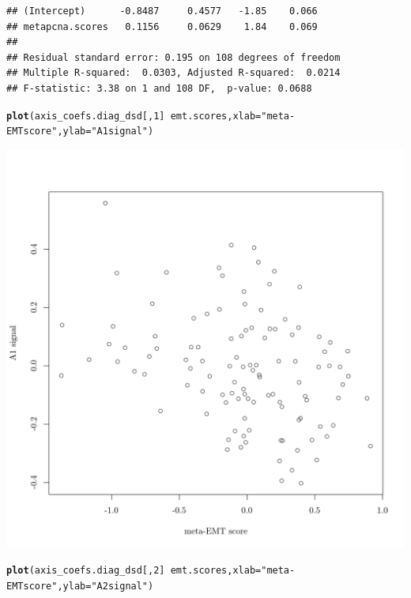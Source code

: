 \documentclass{article}\usepackage[]{graphicx}\usepackage[]{color}
\makeatletter
\def\maxwidth{ %
  \ifdim\Gin@nat@width>\linewidth
    \linewidth
  \else
    \Gin@nat@width
  \fi
}
\newcommand{\hlnum}[1]{\textcolor[rgb]{0.686,0.059,0.569}{#1}}%
\newcommand{\hlstr}[1]{\textcolor[rgb]{0.192,0.494,0.8}{#1}}%
\newcommand{\hlopt}[1]{\textcolor[rgb]{0,0,0}{#1}}%
\newcommand{\hlstd}[1]{\textcolor[rgb]{0.345,0.345,0.345}{#1}}%
\newcommand{\hlkwc}[1]{\textcolor[rgb]{0.333,0.667,0.333}{#1}}%
\newcommand{\hlkwd}[1]{\textcolor[rgb]{0.737,0.353,0.396}{\textbf{#1}}}%
\newenvironment{kframe}{%
 \def\at@end@of@kframe{}%
 \ifinner\ifhmode%
  \def\at@end@of@kframe{\end{minipage}}%
  \begin{minipage}{\columnwidth}%
 \fi\fi%
 \def\FrameCommand##1{\hskip\@totalleftmargin \hskip-\fboxsep
 \colorbox{shadecolor}{##1}\hskip-\fboxsep
     \hskip-\linewidth \hskip-\@totalleftmargin \hskip\columnwidth}%
 \MakeFramed {\advance\hsize-\width
   \@totalleftmargin\z@ \linewidth\hsize
   \@setminipage}}%
 {\par\unskip\endMakeFramed%
 \at@end@of@kframe}
\newenvironment{knitrout}{}{} %
\makeatother
\begin{document}
\begin{knitrout}
\begin{kframe}
\begin{verbatim}
## (Intercept)      -0.8487     0.4577   -1.85    0.066
## metapcna.scores   0.1156     0.0629    1.84    0.069
## 
## Residual standard error: 0.195 on 108 degrees of freedom
## Multiple R-squared:  0.0303,	Adjusted R-squared:  0.0214 
## F-statistic: 3.38 on 1 and 108 DF,  p-value: 0.0688
\end{verbatim}
\begin{alltt}
\hlkwd{plot}\hlstd{(axis_coefs.diag_dsd[,}\hlnum{1}\hlstd{]} \hlopt{~} \hlstd{emt.scores,} \hlkwc{xlab} \hlstd{=} \hlstr{"meta-EMT score"}\hlstd{,} \hlkwc{ylab} \hlstd{=} \hlstr{"A1 signal"}\hlstd{)}
\end{alltt}
\end{kframe}

{\centering \includegraphics[width=\maxwidth]{figure/nmf-msigdb-cor-plots-7} 

}


\begin{kframe}\begin{alltt}
\hlkwd{plot}\hlstd{(axis_coefs.diag_dsd[,}\hlnum{2}\hlstd{]} \hlopt{~} \hlstd{emt.scores,} \hlkwc{xlab} \hlstd{=} \hlstr{"meta-EMT score"}\hlstd{,} \hlkwc{ylab} \hlstd{=} \hlstr{"A2 signal"}\hlstd{)}
\end{alltt}
\end{kframe}


\end{knitrout}
\end{document}
